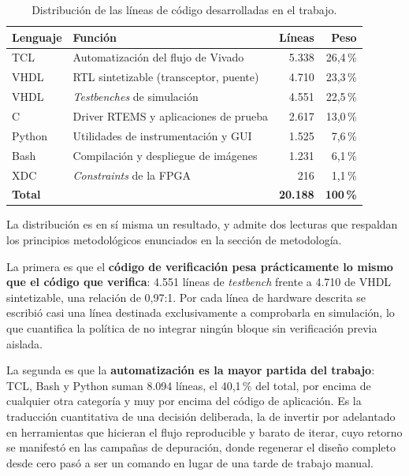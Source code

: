 \begin{table}[H]
    \centering
    \begin{tabular}{llrr}
        \hline
        \textbf{Lenguaje} & \textbf{Función} & \textbf{Líneas} & \textbf{Peso} \\
        \hline
        TCL   & Automatización del flujo de Vivado          & 5.338  & 26,4\,\% \\
        VHDL  & RTL sintetizable (transceptor, puente)      & 4.710  & 23,3\,\% \\
        VHDL  & \textit{Testbenches} de simulación          & 4.551  & 22,5\,\% \\
        C     & Driver RTEMS y aplicaciones de prueba       & 2.617  & 13,0\,\% \\
        Python& Utilidades de instrumentación y GUI         & 1.525  & 7,6\,\% \\
        Bash  & Compilación y despliegue de imágenes        & 1.231  & 6,1\,\% \\
        XDC   & \textit{Constraints} de la FPGA             & 216    & 1,1\,\% \\
        \hline
        \multicolumn{2}{l}{\textbf{Total}} & \textbf{20.188} & \textbf{100\,\%} \\
        \hline
    \end{tabular}
    \caption{Distribución de las líneas de código desarrolladas en el trabajo.}
    \label{tab:loc}
\end{table}

La distribución es en sí misma un resultado, y admite dos lecturas que respaldan los principios
metodológicos enunciados en la sección de metodología.

La primera es que el \textbf{código de verificación pesa prácticamente lo mismo que el código que
verifica}: 4.551 líneas de \textit{testbench} frente a 4.710 de VHDL sintetizable, una relación de
0,97:1. Por cada línea de hardware descrita se escribió casi una línea destinada exclusivamente a
comprobarla en simulación, lo que cuantifica la política de no integrar ningún bloque sin
verificación previa aislada.

La segunda es que la \textbf{automatización es la mayor partida del trabajo}: TCL, Bash y Python
suman 8.094 líneas, el 40,1\,\% del total, por encima de cualquier otra categoría y muy por encima
del código de aplicación. Es la traducción cuantitativa de una decisión deliberada, la de invertir por
adelantado en herramientas que hicieran el flujo reproducible y barato de iterar, cuyo retorno se
manifestó en las campañas de depuración, donde regenerar el diseño completo desde cero pasó a ser
un comando en lugar de una tarde de trabajo manual.
